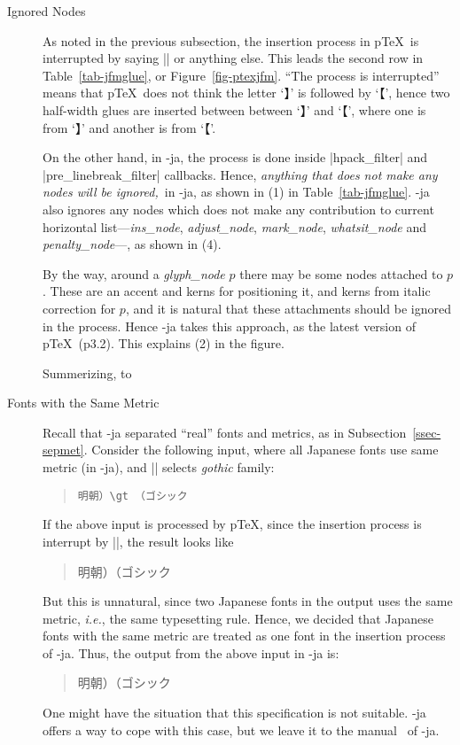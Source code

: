 \documentclass{ajt}
\begin{document}
\begin{description}
\item[Ignored Nodes]
As noted in the previous subsection, the insertion process in p\TeX\ is
	   interrupted by saying |{}| or anything else. This leads the
	   second row in Table~\ref{tab-jfmglue}, or
	   Figure~\ref{fig-ptexjfm}. ``The process is interrupted''
	   means that p\TeX\ does not think the letter `】\inhibitglue'
	   is followed by `\inhibitglue【', hence two half-width glues
	   are inserted between between `】\inhibitglue' and
	   `\inhibitglue【', where one is from `】\inhibitglue' and
	   another is from `\inhibitglue【'.

	   On the other hand, in \LuaTeX-ja, the process is done inside
	   |hpack_filter| and |pre_linebreak_filter| callbacks. Hence,
	   \emph{anything that does not make any nodes will be
	   ignored,}\ in \LuaTeX-ja, as shown in (1) in
	   Table~\ref{tab-jfmglue}. \LuaTeX-ja also ignores any nodes
	   which does not make any contribution to current horizontal
	   list---\emph{ins\_node}, \emph{adjust\_node},
	   \emph{mark\_node}, \emph{whatsit\_node} and
	   \emph{penalty\_node}---, as shown in (4).

By the way, around a \emph{glyph\_node} $p$ there may be some nodes
	   attached to $p$. These are an accent and kerns for
	   positioning it, and kerns from italic correction for $p$, and
	   it is natural that these attachments should be ignored in the
	   process. Hence \LuaTeX-ja takes this approach, as the latest
	   version of p\TeX\ (p3.2). This explains (2) in the figure.

Summerizing, to 

\item[Fonts with the Same Metric]
Recall that \LuaTeX-ja separated ``real'' fonts and metrics, as in Subsection~\ref{ssec-sepmet}. 
Consider the following input, where all Japanese fonts
	   use same metric (in \LuaTeX-ja), and |\gt| selects \emph{gothic} family:
\begin{quote}
\begin{verbatim}
明朝）\gt （ゴシック
\end{verbatim}
\end{quote}
If the above input is processed by p\TeX, since the insertion process is
	   interrupt by |\gt|, the result looks like
\begin{quote}
\mc 明朝）\hbox{}\gt （ゴシック
\end{quote}
But this is unnatural, since two Japanese fonts in the output uses the
same metric, \emph{i.e.}, the same typesetting rule.  Hence, we decided
that Japanese fonts with the same metric are treated as one font in the
insertion process of \LuaTeX-ja. Thus, the output from the above input
in \LuaTeX-ja is:
\begin{quote}
\mc 明朝）\gt （ゴシック
\end{quote}
One might have the situation that this specification is not
	   suitable. \LuaTeX-ja offers a way to cope with this case, but
	   we leave it to the manual~\cite{man} of \LuaTeX-ja.


\end{description}
\end{document}

